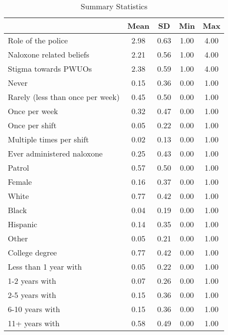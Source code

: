 \begin{table}[htbp]\centering
\def\sym#1{\ifmmode^{#1}\else\(^{#1}\)\fi}
\caption{\centering Summary Statistics}
\begin{tabular}{l*{1}{cccc}}
\hline\hline
                &     Mean&       SD&      Min&      Max\\
\hline
Role of the police&     2.98&     0.63&     1.00&     4.00\\
Naloxone related beliefs&     2.21&     0.56&     1.00&     4.00\\
Stigma towards PWUOs&     2.38&     0.59&     1.00&     4.00\\
Never           &     0.15&     0.36&     0.00&     1.00\\
Rarely (less than once per week)&     0.45&     0.50&     0.00&     1.00\\
Once per week   &     0.32&     0.47&     0.00&     1.00\\
Once per shift  &     0.05&     0.22&     0.00&     1.00\\
Multiple times per shift&     0.02&     0.13&     0.00&     1.00\\
Ever administered naloxone&     0.25&     0.43&     0.00&     1.00\\
Patrol          &     0.57&     0.50&     0.00&     1.00\\
Female          &     0.16&     0.37&     0.00&     1.00\\
White           &     0.77&     0.42&     0.00&     1.00\\
Black           &     0.04&     0.19&     0.00&     1.00\\
Hispanic        &     0.14&     0.35&     0.00&     1.00\\
Other           &     0.05&     0.21&     0.00&     1.00\\
College degree  &     0.77&     0.42&     0.00&     1.00\\
Less than 1 year with&     0.05&     0.22&     0.00&     1.00\\
1-2 years with  &     0.07&     0.26&     0.00&     1.00\\
2-5 years with  &     0.15&     0.36&     0.00&     1.00\\
6-10 years with &     0.15&     0.36&     0.00&     1.00\\
11+ years with  &     0.58&     0.49&     0.00&     1.00\\
\hline\hline
\end{tabular}
\end{table}
